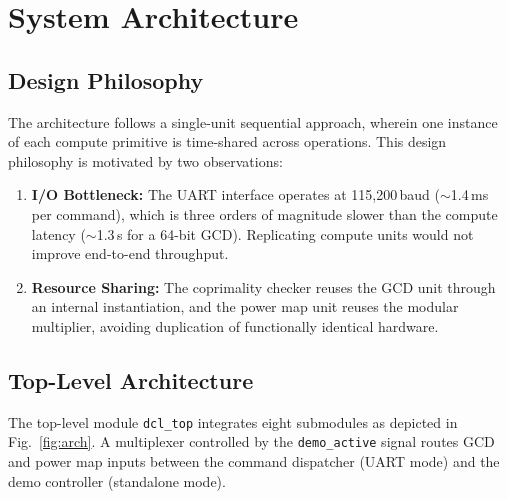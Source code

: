\documentclass[lettersize,journal]{IEEEtran}
\begin{document}
\section{System Architecture}
\label{sec:arch}

\subsection{Design Philosophy}

The architecture follows a single-unit sequential approach, wherein one instance of each compute primitive is time-shared across operations. This design philosophy is motivated by two observations:

\begin{enumerate}
\item \textbf{I/O Bottleneck:} The UART interface operates at 115{,}200\,baud ($\sim$1.4\,ms per command), which is three orders of magnitude slower than the compute latency ($\sim$1.3\,\textmu s for a 64-bit GCD). Replicating compute units would not improve end-to-end throughput.
\item \textbf{Resource Sharing:} The coprimality checker reuses the GCD unit through an internal instantiation, and the power map unit reuses the modular multiplier, avoiding duplication of functionally identical hardware.
\end{enumerate}

\subsection{Top-Level Architecture}

The top-level module \texttt{dcl\_top} integrates eight submodules as depicted in Fig.~\ref{fig:arch}. A multiplexer controlled by the \texttt{demo\_active} signal routes GCD and power map inputs between the command dispatcher (UART mode) and the demo controller (standalone mode).
\end{document}
